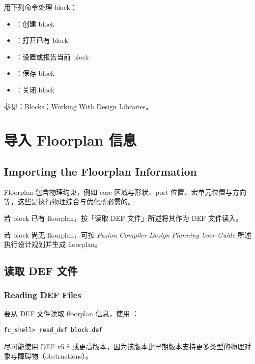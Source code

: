 用下列命令处理 block：
\begin{itemize}
  \item {}：创建 block
  \item {}：打开已有 block
  \item {}：设置或报告当前 block
  \item {}：保存 block
  \item {}：关闭 block
\end{itemize}

\begin{seeAlsoBox}
参见：Blocks；Working With Design Libraries。
\end{seeAlsoBox}

\section{导入 Floorplan 信息}
\subsection*{Importing the Floorplan Information}

Floorplan 包含物理约束，例如 core 区域与形状、port 位置、宏单元位置与方向等，这些是执行物理综合与优化所必需的。

若 block 已有 floorplan，按「读取 DEF 文件」所述将其作为 DEF 文件读入。

若 block 尚无 floorplan，可按 \textit{Fusion Compiler Design Planning User Guide} 所述执行设计规划并生成 floorplan。

\subsection{读取 DEF 文件}
\subsubsection*{Reading DEF Files}

要从 DEF 文件读取 floorplan 信息，使用 ：
\begin{lstlisting}
fc_shell> read_def block.def
\end{lstlisting}

\begin{noteBox}
尽可能使用 DEF v5.8 或更高版本，因为该版本比早期版本支持更多类型的物理对象与障碍物（obstructions）。
\end{noteBox}

